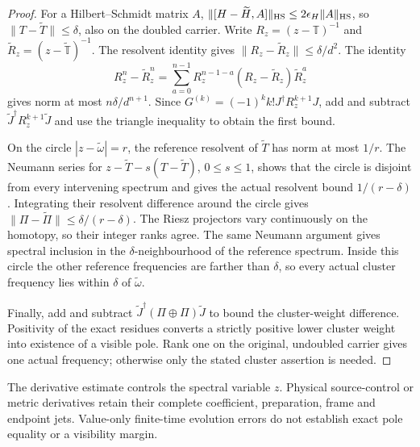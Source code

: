 \documentclass[12pt,a4paper]{article}
\begin{document}
\begin{proof}
For a Hilbert--Schmidt matrix $A$,
$\|[H-\widetilde H,A]\|_{\rm HS}
 \le2\epsilon_H\|A\|_{\rm HS}$, so
$\|T-\widetilde T\|\le\delta$, also on the doubled carrier.
Write $R_z=(z-\mathbb T)^{-1}$ and
$\widetilde R_z=(z-\widetilde{\mathbb T})^{-1}$.
The resolvent identity gives
$\|R_z-\widetilde R_z\|\le\delta/d^2$.
The identity
\[
 R_z^n-\widetilde R_z^n
 =\sum_{a=0}^{n-1}R_z^{n-1-a}
 (R_z-\widetilde R_z)\widetilde R_z^a
\]
gives norm at most $n\delta/d^{n+1}$.
Since $G^{(k)}=(-1)^kk!J^\dagger R_z^{k+1}J$,
add and subtract $\widetilde J^\dagger R_z^{k+1}\widetilde J$
and use the triangle inequality to obtain the first bound.

On the circle $|z-\widetilde\omega|=r$, the reference resolvent
of $\widetilde T$ has norm at most $1/r$. The Neumann series for
$z-\widetilde T-s(T-\widetilde T)$, $0\le s\le1$, shows that
the circle is disjoint from every intervening spectrum and gives the
actual resolvent bound $1/(r-\delta)$. Integrating their resolvent
difference around the circle gives
$\|\Pi-\widetilde\Pi\|\le\delta/(r-\delta)$.
The Riesz projectors vary continuously on the homotopy, so their
integer ranks agree. The same Neumann argument gives spectral
inclusion in the $\delta$-neighbourhood of the reference spectrum.
Inside this circle the other reference frequencies are farther than
$\delta$, so every actual cluster frequency lies within $\delta$
of $\widetilde\omega$.

Finally, add and subtract
$\widetilde J^\dagger(\Pi\oplus\Pi)\widetilde J$ to bound the
cluster-weight difference. Positivity of the exact residues converts
a strictly positive lower cluster weight into existence of a visible
pole. Rank one on the original, undoubled carrier gives one actual
frequency; otherwise only the stated cluster assertion is needed.
\end{proof}
The derivative estimate controls the spectral variable $z$. Physical
source-control or metric derivatives retain their complete coefficient,
preparation, frame and endpoint jets. Value-only finite-time evolution
errors do not establish exact pole equality or a visibility margin.
\end{document}
